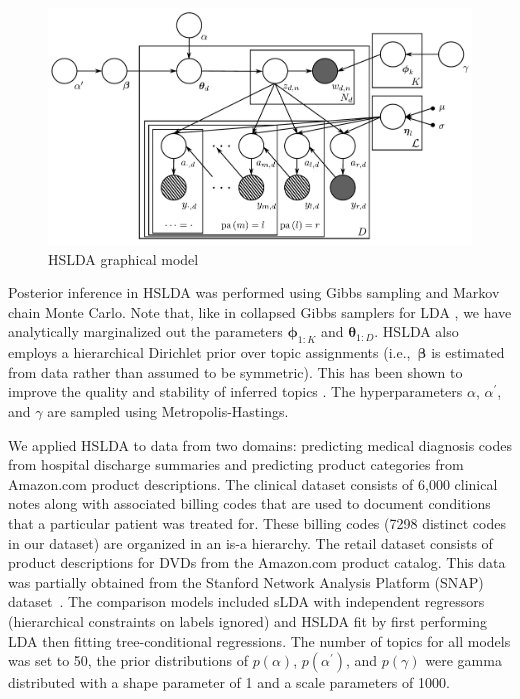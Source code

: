 \begin{figure}[t]
 \centering \includegraphics[scale=0.25]{Graphical_Model-final} \caption{HSLDA graphical model}


\label{fig:graphical_model} 
\end{figure}


Posterior inference in HSLDA was performed using Gibbs sampling and Markov chain Monte Carlo.  Note that, like in collapsed Gibbs samplers for LDA \cite{Griffiths04}, we have analytically marginalized out the parameters $\boldsymbol{\phi}_{1:K}$
and $\boldsymbol{\theta}_{1:D}$. HSLDA also employs a hierarchical Dirichlet prior over topic assignments (i.e.,~$\boldsymbol\beta$ is estimated from data rather than assumed to be symmetric).  This has been shown to improve the quality and stability of inferred topics \citep{WallachMiMc2009}. The hyperparameters $\alpha$, $\alpha^{\prime}$, and $\gamma$ are
sampled
using Metropolis-Hastings. 


We applied HSLDA to data from two domains: predicting medical
diagnosis codes from hospital discharge summaries and predicting product
categories from Amazon.com product descriptions. The clinical dataset consists
of 6,000 clinical notes along with associated billing codes that are used
to document conditions that a particular patient was treated for. These billing
codes (7298 distinct codes in our dataset) are organized in an is-a hierarchy. The retail dataset
consists of product descriptions for DVDs from the Amazon.com product catalog. This data
was partially obtained from the Stanford Network Analysis Platform (SNAP) dataset~\citep{SNAP}. The comparison models included sLDA with independent
regressors (hierarchical constraints on labels ignored) and HSLDA fit by first
performing LDA then fitting tree-conditional regressions. The number of topics for all models was set to 50, the prior distributions of
$p\left(\alpha\right)$, $p\left(\alpha^{\prime}\right)$, and
$p\left(\gamma\right)$ were gamma distributed with a shape parameter of 1 and a
scale parameters of 1000. 

